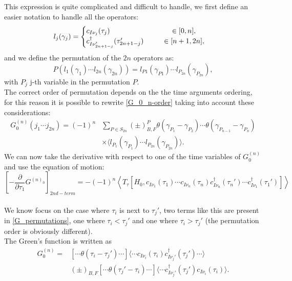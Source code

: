 This expression is quite complicated and difficult to handle, we first define an easier notation to handle all the operators:
\begin{equation}
    l_j(\gamma_j) = 
    \begin{cases}
        c_{I\nu_j}(\tau_j)\hspace{2.95cm}\in[0,n], \\
        c^\dagger_{I\nu_{2n+1-j}'}(\tau_{2n+1-j}')\hspace{0.9cm}\in[n+1,2n],
    \end{cases}
    \label{eq:signfunction}
\end{equation}
and we define the permutation of the $2n$ operators as:
\begin{equation}
    P(l_1(\gamma_1)\cdots l_{2n}(\gamma_{2n}))=l_{P1}(\gamma_{P1})\cdots l_{P_{2n}}(\gamma_{P_{2n}}),
\end{equation}
with $P_j$ j-th variable in the permutation $P$.\\
The correct order of permutation depends on the the time arguments ordering, for this reason it is possible to rewrite \ref{G_0_n-order} 
taking into account these considerations:
\begin{equation}
\begin{split}
    G^{(n)}_0(j_1\cdots j_{2n})=(-1)^n&\sum_{P\in S_{2n}}(\pm)^{P}_{B,F}\theta(\gamma_{P_1}-\gamma_{P_2})\cdots\theta(\gamma_{P_{n-1}}-\gamma_{P_n})\\
    &\times\langle l_{P_1}(\gamma_{P_1})\cdots l_{P_{2n}}(\gamma_{P_{2n}})\rangle.
\end{split}
\label{G_permutations}
\end{equation}
We can now take the derivative with respect to one of the time variables of $G^{(n)}_0$ and use the equation of motion:
\begin{equation}
    \left[-\frac{\partial}{\partial\tau_1}G^{(n)_0}\right]_{2nd-term}=-(-1)^n\left\langle T_\tau\left[H_0,c_{I\nu_1}(\tau_1)\cdots c_{I\nu_n}(\tau_n)c^\dagger_{I\nu_n}(\tau_n')\cdots c^\dagger_{I\nu_1}(\tau_1')\right]\right\rangle
\end{equation}
\\
We know focus on the case where $\tau_i$ is next to $\tau_j'$, two terms like this are present in \ref{G_permutations}, one where $\tau_i<\tau_j'$ and one where 
$\tau_i>\tau_j'$ (the permutation order is obviously different).\\
The Green's function is written as 
\begin{equation}
\begin{split}
    G_0^{(n)}=&\left[\cdots \theta(\tau_i-\tau_j')\cdots\right]\langle \cdots c_{I\nu_i}(\tau_i)c^\dagger_{I\nu_j'}(\tau_j')\cdots\rangle \\
    &(\pm)_{B,F}[\cdots \theta(\tau_j'-\tau_i)\cdots]\langle \cdots c^\dagger_{I\nu_j'}(\tau_j')c_{I\nu_i}(\tau_i)\rangle.
\end{split}
\end{equation}

